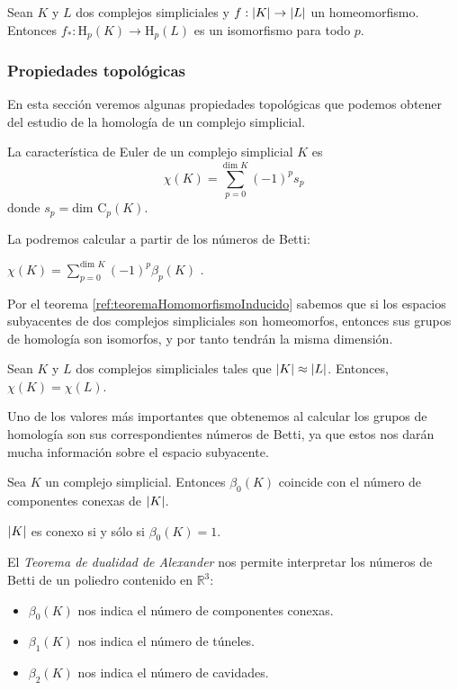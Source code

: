 \begin{theorem}\label{ref:teoremaHomomorfismoInducido}
Sean $K$ y $L$ dos complejos simpliciales y $f: \lvert K\rvert \to \lvert L\rvert$ un homeomorfismo. Entonces $f_{*}: \text{H}_p(K) \to \text{H}_p(L)$ es un isomorfismo para todo $p$.
\end{theorem}


\subsubsection*{Propiedades topológicas}
En esta sección veremos algunas propiedades topológicas que podemos obtener del estudio de la homología de un complejo simplicial.

\begin{definition}
La característica de Euler de un complejo simplicial $K$ es 
\[
\chi(K) = \sum_{p=0}^{\text{dim } K} (-1)^p s_p
\]
donde $s_p = \text{dim } \text{C}_p(K)$.
\end{definition}
La podremos calcular a partir de los números de Betti:
\begin{theorem}
$\chi(K) = \sum_{p=0}^{\text{dim } K} (-1)^p \beta_p(K)$ \cite{libroEH}.
\end{theorem}

Por el teorema \ref{ref:teoremaHomomorfismoInducido} sabemos que si los espacios subyacentes de dos complejos simpliciales son homeomorfos, entonces sus grupos de homología son isomorfos, y por tanto tendrán la misma dimensión.
\begin{corollary}
\begin{sloppypar}
Sean $K$ y $L$ dos complejos simpliciales tales que $\lvert K\rvert \approx \lvert L\rvert$. Entonces, ${\chi(K)=\chi(L)}$.
\end{sloppypar}
\end{corollary}

Uno de los valores más importantes que obtenemos al calcular los grupos de homología son sus correspondientes números de Betti, ya que estos nos darán mucha información sobre el espacio subyacente. 
\begin{theorem}
Sea $K$ un complejo simplicial. Entonces $\beta_0(K)$ coincide con el número de componentes conexas de $\lvert K\rvert$.
\end{theorem}

\begin{corollary}
$\lvert K\rvert$ es conexo si y sólo si $\beta_0(K)=1$.
\end{corollary}

El \emph{Teorema de dualidad de Alexander} \cite{libroEH} nos permite interpretar los números de Betti de un poliedro contenido en $\mathbb{R}^3$: 
\begin{itemize}
	\item $\beta_0(K)$ nos indica el número de componentes conexas.
	\item $\beta_1(K)$ nos indica el número de túneles.
	\item $\beta_2(K)$ nos indica el número de cavidades.
\end{itemize}

